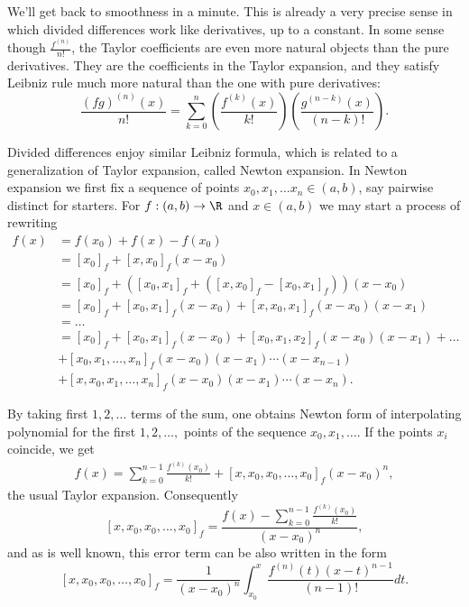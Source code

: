 We'll get back to smoothness in a minute. This is already a very precise sense in which divided differences work like derivatives, up to a constant. In some sense though $\frac{f^{(n)}}{n!}$, the Taylor coefficients are even more natural objects than the pure derivatives. They are the coefficients in the Taylor expansion, and they satisfy Leibniz rule much more natural than the one with pure derivatives:
\[
	\frac{(f g)^{(n)}(x)}{n!} = \sum_{k = 0}^{n} \left(\frac{f^{(k)}(x)}{k!}\right)\left(\frac{g^{(n - k)}(x)}{(n - k)!}\right).
\]

Divided differences enjoy similar Leibniz formula, which is related to a generalization of Taylor expansion, called Newton expansion. In Newton expansion we first fix a sequence of points $x_{0}, x_{1}, \ldots x_{n} \in (a, b)$, say pairwise distinct for starters. For $f : (a, b) \to \R$ and $x \in (a, b)$ we may start a process of rewriting
\begin{align*}
	f(x) &= f(x_0) + f(x) - f(x_{0}) \\
	&= [x_{0}]_{f} + [x, x_{0}]_{f} (x - x_{0}) \\
	&= [x_{0}]_{f} + ([x_{0}, x_{1}]_{f} + ([x, x_{0}]_{f}- [x_{0}, x_{1}]_{f}))(x - x_{0}) \\
	&= [x_{0}]_{f} + [x_{0}, x_{1}]_{f} (x - x_{0})  + [x, x_{0}, x_{1}]_{f} (x - x_{0}) (x - x_{1}) \\
	&= \ldots \\
	&= [x_{0}]_{f} + [x_{0}, x_{1}]_{f} (x - x_{0})  + [x_{0}, x_{1}, x_{2}]_{f} (x - x_{0}) (x - x_{1}) + \ldots \\
	& + [x_{0}, x_{1}, \ldots, x_{n}]_{f} (x - x_{0}) (x - x_{1}) \cdots (x - x_{n - 1}) \\
	& + [x, x_{0}, x_{1}, \ldots, x_{n}]_{f} (x - x_{0}) (x - x_{1}) \cdots (x - x_{n}).
\end{align*}

By taking first $1, 2, \ldots$ terms of the sum, one obtains Newton form of interpolating polynomial for the first $1, 2, \ldots, $ points of the sequence $x_{0}, x_{1}, \ldots$. If the points $x_{i}$ coincide, we get
\begin{align}\label{taylor_expansion}
	f(x) = \sum_{k = 0}^{n - 1} \frac{f^{(k)}(x_{0})}{k!} + [x, x_{0}, x_{0}, \ldots, x_{0}]_{f} (x - x_{0})^{n},
\end{align}
the usual Taylor expansion. Consequently
\[
	[x, x_{0}, x_{0}, \ldots, x_{0}]_{f} = \frac{f(x) - \sum_{k = 0}^{n - 1} \frac{f^{(k)}(x_{0})}{k!}}{(x - x_{0})^{n}},
\]
and as is well known, this error term can be also written in the form
\[
	[x, x_{0}, x_{0}, \ldots, x_{0}]_{f} = \frac{1}{(x - x_{0})^{n}}\int_{x_{0}}^{x} \frac{f^{(n)}(t) (x - t)^{n - 1}}{(n - 1)!} dt.
\]

